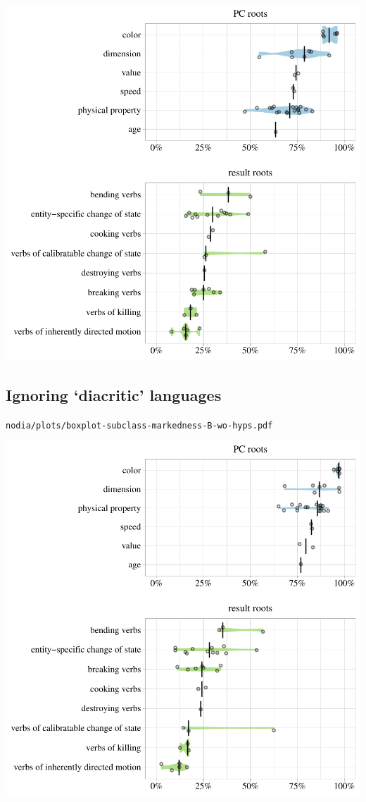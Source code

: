 \includegraphics[width=1.0\textwidth]{../nolow/plots/boxplot-subclass-markedness-B-wo-hyps.pdf}

\subsection{Ignoring `diacritic' languages}

\texttt{nodia/plots/boxplot-subclass-markedness-B-wo-hyps.pdf}

\includegraphics[width=1.0\textwidth]{../nodia/plots/boxplot-subclass-markedness-B-wo-hyps.pdf}

